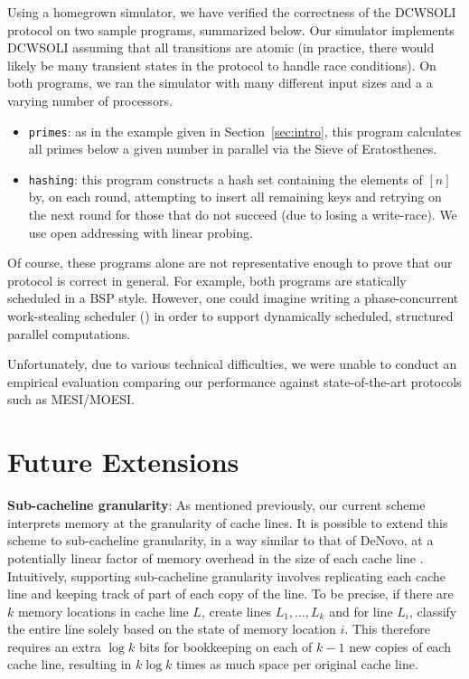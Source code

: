 \documentclass{article}
\begin{document}
Using a homegrown simulator, we have verified the correctness of the DCWSOLI
protocol on two sample programs, summarized below. Our simulator implements
DCWSOLI assuming that all transitions are atomic (in practice, there would
likely be many transient states in the protocol to handle race conditions).
On both programs, we ran the simulator with many different input sizes and a
a varying number of processors.
\begin{itemize}
  \item \texttt{primes}: as in the example given in Section~\ref{sec:intro},
  this program calculates all primes below a given number in parallel via the
  Sieve of Eratosthenes.
  \item \texttt{hashing}: this program constructs a hash set containing the
  elements of $[n]$ by, on each round, attempting to insert all remaining
  keys and retrying on the next round for those that do not succeed (due to
  losing a write-race). We use open addressing with linear probing.
\end{itemize}
Of course, these programs alone are not representative enough to prove that
our protocol is correct in general. For example, both programs are statically
scheduled in a BSP style. However, one could imagine writing a phase-concurrent
work-stealing scheduler (\cite{blumofe1999scheduling}) in order to support
dynamically scheduled, structured parallel computations.

Unfortunately, due to various technical difficulties, we were unable to conduct
an empirical evaluation comparing our performance against state-of-the-art
protocols such as MESI/MOESI.


\section{Future Extensions}
\textbf{Sub-cacheline granularity}: As mentioned previously, our current scheme interprets memory at the granularity of cache lines. It is possible to extend this scheme to sub-cacheline granularity, in a way similar to that of DeNovo, at a potentially linear factor of memory overhead in the size of each cache line \cite{choi2010denovo}. Intuitively, supporting sub-cacheline granularity involves replicating each cache line and keeping track of part of each copy of the line. To be precise, if there are $k$ memory locations in cache line $L$, create lines $L_1, \dots, L_k$ and for line $L_i$, classify the entire line solely based on the state of memory location $i$. This therefore requires an extra $\log k$ bits for bookkeeping on each of $k-1$ new copies of each cache line, resulting in $k \log k$ times as much space per original cache line.
\end{document}
